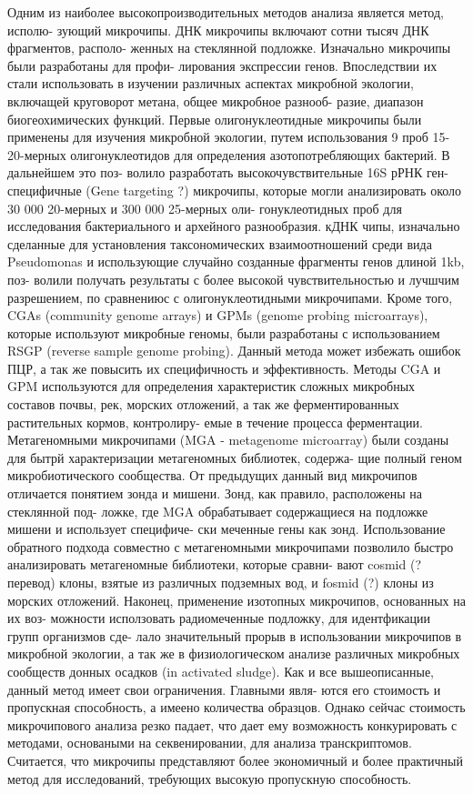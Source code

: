 Одним из наиболее высокопроизводительных методов анализа является метод, исполю-
зующий микрочипы. ДНК микрочипы включают сотни тысяч ДНК фрагментов, располо-
женных на стеклянной подложке. Изначально микрочипы были разработаны для профи-
лирования экспрессии генов. Впоследствии их стали использовать в изучении различных
аспектах микробной экологии, включащей круговорот метана, общее микробное разнооб-
разие, диапазон биогеохимических функций. Первые олигонуклеотидные микрочипы были
применены для изучения микробной экологии, путем использования 9 проб 15-20-мерных
олигонуклеотидов для определения азотопотребляющих бактерий. В дальнейшем это поз-
волило разработать высокочувствительные 16S рРНК ген-специфичные (Gene targeting ?)
микрочипы, которые могли анализировать около 30 000 20-мерных и 300 000 25-мерных оли-
гонуклеотидных проб для исследования бактериального и архейного разнообразия. кДНК
чипы, изначально сделанные для установления таксономических взаимоотношений среди
вида Pseudomonas и использующие случайно созданные фрагменты генов длиной 1kb, поз-
волили получать результаты с более высокой чувствительностью и лучшчим разрешением,
по сравнениюс с олигонуклеотидными микрочипами. Кроме того, CGAs (community genome
arrays) и GPMs (genome probing microarrays), которые используют микробные геномы, были
разработаны с использованием RSGP (reverse sample genome probing). Данный метода может
избежать ошибок ПЦР, а так же повысить их специфичность и эффективность. Методы CGA
и GPM используются для определения характеристик сложных микробных составов почвы,
рек, морских отложений, а так же ферментированных растительных кормов, контролиру-
емые в течение процесса ферментации. Метагеномными микрочипами (MGA - metagenome
microarray) были созданы для бытрй характеризации метагеномных библиотек, содержа-
щие полный геном микробиотического сообщества. От предыдущих данный вид микрочипов
отличается понятием зонда и мишени. Зонд, как правило, расположены на стеклянной под-
ложке, где MGA обрабатывает содержащиеся на подложке мишени и использует специфиче-
ски меченные гены как зонд. Использование обратного подхода совместно с метагеномными
микрочипами позволило быстро анализировать метагеномные библиотеки, которые сравни-
вают cosmid (? перевод) клоны, взятые из различных подземных вод, и fosmid (?) клоны
из морских отложений. Наконец, применение изотопных микрочипов, основанных на их воз-
можности исползовать радиомеченные подложку, для идентфикации групп организмов сде-
лало значительный прорыв в использовании микрочипов в микробной экологии, а так же
в физиологическом анализе различных микробных сообществ донных осадков (in activated
sludge). Как и все вышеописанные, данный метод имеет свои ограничения. Главными явля-
ются его стоимость и пропускная способность, а имеено количества образцов. Однако сейчас
стоимость микрочипового анализа резко падает, что дает ему возможность конкурировать
с методами, основаными на секвенировании, для анализа транскриптомов. Считается, что
микрочипы представляют более экономичный и более практичный метод для исследований,
требующих высокую пропускную способность.

